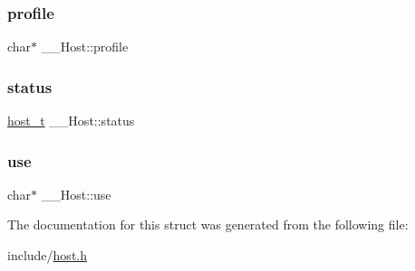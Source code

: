 \mbox{\label{struct_____host_abfbef38d66410fc8705ea35967e65115}} 
\subsubsection{\texorpdfstring{profile}{profile}}
{\footnotesize\ttfamily char$\ast$ \+\_\+\+\_\+\+Host\+::profile}

\mbox{\label{struct_____host_a0a366a15966b166891ba8451009df63d}} 
\subsubsection{\texorpdfstring{status}{status}}
{\footnotesize\ttfamily \mbox{\hyperlink{host_8h_a1392734739c1e1eba62ebfab3bf7dc92}{host\+\_\+t}} \+\_\+\+\_\+\+Host\+::status}

\mbox{\label{struct_____host_a29d2f3a317a102944ed07955038d827c}} 
\subsubsection{\texorpdfstring{use}{use}}
{\footnotesize\ttfamily char$\ast$ \+\_\+\+\_\+\+Host\+::use}



The documentation for this struct was generated from the following file\+:\begin{DoxyCompactItemize}
\item 
include/\mbox{\hyperlink{host_8h}{host.\+h}}\end{DoxyCompactItemize}
